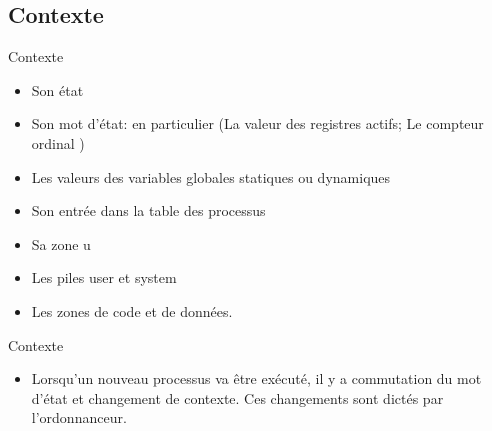 \begin{frame}{\sectitle}
\def\subsectitle{Contexte}
\subsection{\subsectitle}

\begin{block}{\subsectitle}
\begin{itemize}
\item Son état
\item Son mot d'état: en particulier
          (La valeur des registres actifs; Le compteur ordinal )
\item Les valeurs des variables globales statiques ou dynamiques
\item Son entrée dans la table des processus
\item Sa zone u
\item Les piles user et system
\item Les zones de code et de données. 
\end{itemize}
\end{block}

\begin{block}{\subsectitle}
\begin{itemize}
    \item Lorsqu'un nouveau processus va être exécuté, il y a commutation du mot
    d'état et changement de contexte. Ces changements sont dictés par
    l'ordonnanceur.
\end{itemize}
\end{block}
\end{frame}



\def\sectitle{Mécanisme de contrôle}

